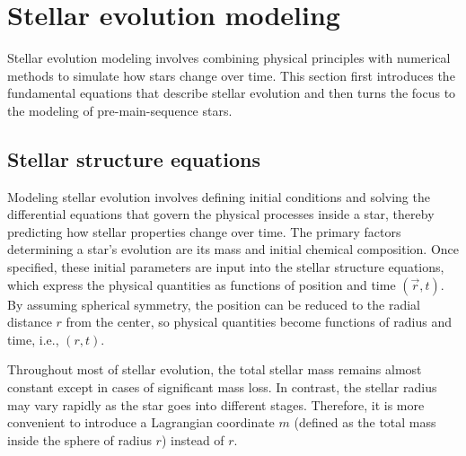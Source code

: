 \documentclass[12pt,a4paper]{article}
\begin{document}
\section{Stellar evolution modeling}
\label{sec:stellar_evol}

Stellar evolution modeling involves combining physical principles with numerical methods to simulate how stars change over time. This section first introduces the fundamental equations that describe stellar evolution and then turns the focus to the modeling of pre-main-sequence stars.

\subsection{Stellar structure equations}
\label{sec:stellar_evol_formulation}

Modeling stellar evolution involves defining initial conditions and solving the differential equations that govern the physical processes inside a star, thereby predicting how stellar properties change over time. The primary factors determining a star's evolution are its mass and initial chemical composition. Once specified, these initial parameters are input into the stellar structure equations, which express the physical quantities as functions of position and time $(\vec{r}, t)$. By assuming spherical symmetry, the position can be reduced to the radial distance $r$ from the center, so physical quantities become functions of radius and time, i.e., $(r, t)$.

Throughout most of stellar evolution, the total stellar mass remains almost constant except in cases of significant mass loss. In contrast, the stellar radius may vary rapidly as the star goes into different stages. Therefore, it is more convenient to introduce a Lagrangian coordinate $m$ (defined as the total mass inside the sphere of radius $r$) instead of $r$. 
\end{document}

